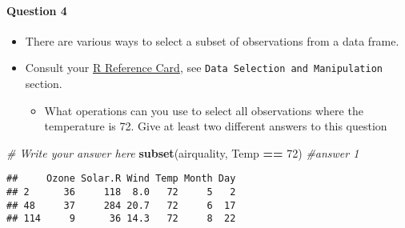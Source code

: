 \documentclass[
]{article}
\newenvironment{Shaded}{\begin{snugshade}}{\end{snugshade}}
\newcommand{\CommentTok}[1]{\textcolor[rgb]{0.56,0.35,0.01}{\textit{#1}}}
\newcommand{\DataTypeTok}[1]{\textcolor[rgb]{0.13,0.29,0.53}{#1}}
\newcommand{\DecValTok}[1]{\textcolor[rgb]{0.00,0.00,0.81}{#1}}
\newcommand{\KeywordTok}[1]{\textcolor[rgb]{0.13,0.29,0.53}{\textbf{#1}}}
\newcommand{\NormalTok}[1]{#1}
\newcommand{\OperatorTok}[1]{\textcolor[rgb]{0.81,0.36,0.00}{\textbf{#1}}}
\newcommand{\OtherTok}[1]{\textcolor[rgb]{0.56,0.35,0.01}{#1}}
\newcommand{\StringTok}[1]{\textcolor[rgb]{0.31,0.60,0.02}{#1}}
\providecommand{\tightlist}{%
  \setlength{\itemsep}{0pt}\setlength{\parskip}{0pt}}
\begin{document}
\begin{Shaded}
\end{Shaded}

\hypertarget{question-4}{%
\paragraph{Question 4}\label{question-4}}

\begin{itemize}
\item
  There are various ways to select a subset of observations from a data
  frame.
\item
  Consult your
  \href{https://cran.r-project.org/doc/contrib/Baggott-refcard-v2.pdf}{R
  Reference Card}, see \texttt{Data\ Selection\ and\ Manipulation}
  section.

  \begin{itemize}
  \tightlist
  \item
    What operations can you use to select all observations where the
    temperature is 72. Give at least two different answers to this
    question
  \end{itemize}
\end{itemize}

\begin{Shaded}
\begin{Highlighting}[]
\CommentTok{# Write your answer here}
\KeywordTok{subset}\NormalTok{(airquality, Temp }\OperatorTok{==}\StringTok{ }\DecValTok{72}\NormalTok{) }\CommentTok{#answer 1}
\end{Highlighting}
\end{Shaded}

\begin{verbatim}
##     Ozone Solar.R Wind Temp Month Day
## 2      36     118  8.0   72     5   2
## 48     37     284 20.7   72     6  17
## 114     9      36 14.3   72     8  22
\end{verbatim}

\begin{Shaded}
\end{Shaded}
\end{document}
